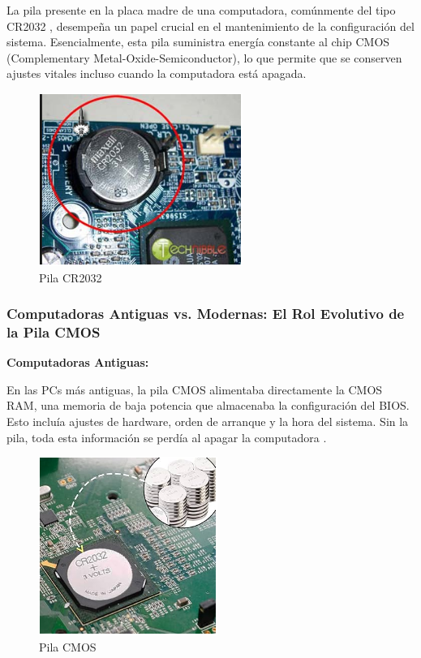 La pila presente en la placa madre de una computadora, comúnmente del tipo CR2032 \cite{profesionalpila}, desempeña un papel crucial en el mantenimiento de la configuración del sistema. Esencialmente, esta pila suministra energía constante al chip CMOS (Complementary Metal-Oxide-Semiconductor), lo que permite que se conserven ajustes vitales incluso cuando la computadora está apagada.

\begin{figure}
  \centering
  \includegraphics[scale=0.9]{imagenes/pila-cr2032.png}
  \caption{Pila CR2032}
\end{figure}

\subsubsection{Computadoras Antiguas vs. Modernas: El Rol Evolutivo de la Pila CMOS}

\textbf{Computadoras Antiguas:}

En las PCs más antiguas, la pila CMOS alimentaba directamente la CMOS RAM, una memoria de baja potencia que almacenaba la configuración del BIOS. Esto incluía ajustes de hardware, orden de arranque y la hora del sistema. Sin la pila, toda esta información se perdía al apagar la computadora \cite{profesionalpila}.

\begin{figure}
  \centering
  \includegraphics[scale=0.9]{imagenes/pila-cmos.png}
  \caption{Pila CMOS}
\end{figure}


